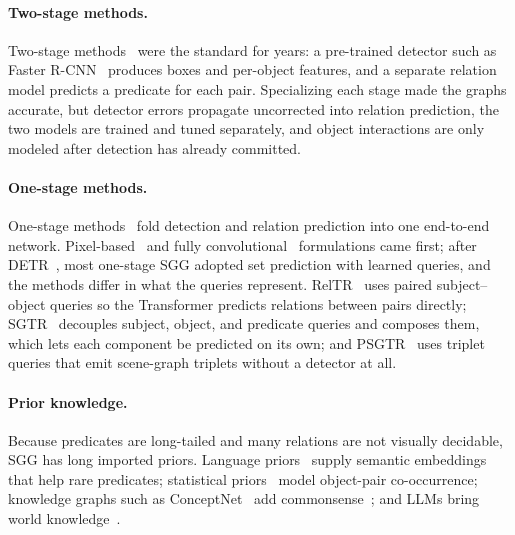 \paragraph{Two-stage methods.}
Two-stage methods~\cite{xu2017scene,zellers2018neural,li2021bipartite,lin2020gps,li2023compositional,zhou2024hierarchical} were the standard for years: a pre-trained detector such as Faster R-CNN~\cite{ren2015faster} produces boxes and per-object features, and a separate relation model predicts a predicate for each pair. Specializing each stage made the graphs accurate, but detector errors propagate uncorrected into relation prediction, the two models are trained and tuned separately, and object interactions are only modeled after detection has already committed.

\paragraph{One-stage methods.}
One-stage methods~\cite{im2024egtr,wang2024oed,newell2017pixels,liu2021fully} fold detection and relation prediction into one end-to-end network. Pixel-based~\cite{newell2017pixels} and fully convolutional~\cite{liu2021fully} formulations came first; after DETR~\cite{carion2020end}, most one-stage SGG adopted set prediction with learned queries, and the methods differ in what the queries represent. RelTR~\cite{cong2023reltr} uses paired subject--object queries so the Transformer predicts relations between pairs directly; SGTR~\cite{li2022sgtr} decouples subject, object, and predicate queries and composes them, which lets each component be predicted on its own; and PSGTR~\cite{yang2022panoptic} uses triplet queries that emit scene-graph triplets without a detector at all.

\paragraph{Prior knowledge.}
Because predicates are long-tailed and many relations are not visually decidable, SGG has long imported priors. Language priors~\cite{liang2017deep,lu2016visual,cui2018context} supply semantic embeddings that help rare predicates; statistical priors~\cite{yu2017visual,zhou2023learning,zhou2024hierarchical} model object-pair co-occurrence; knowledge graphs such as ConceptNet~\cite{speer2017conceptnet} add commonsense~\cite{zhang2024hiker,chen2023more}; and LLMs bring world knowledge~\cite{chen2024scene,kim2024llm4sgg}.


